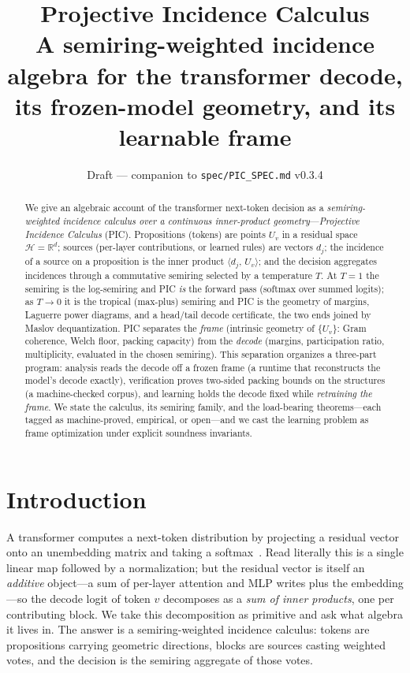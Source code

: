 \documentclass[11pt]{article}
\title{\textbf{Projective Incidence Calculus}\\[0.3em]
\large A semiring-weighted incidence algebra for the transformer decode,\\
its frozen-model geometry, and its learnable frame}
\author{}
\date{Draft --- companion to \texttt{spec/PIC\_SPEC.md} v0.3.4}
\theoremstyle{definition}
\theoremstyle{plain}
\theoremstyle{remark}
\newcommand{\HH}{\mathcal{H}}
\newcommand{\RR}{\mathbb{R}}
\newcommand{\inner}[2]{\langle #1,\, #2\rangle}
\begin{document}
\maketitle

\begin{abstract}
We give an algebraic account of the transformer next-token decision as a \emph{semiring-weighted
incidence calculus over a continuous inner-product geometry}---\emph{Projective Incidence Calculus}
(PIC). Propositions (tokens) are points $U_v$ in a residual space $\HH=\RR^d$; sources (per-layer
contributions, or learned rules) are vectors $d_j$; the incidence of a source on a proposition is the
inner product $\inner{d_j}{U_v}$; and the decision aggregates incidences through a commutative semiring
selected by a temperature $T$. At $T=1$ the semiring is the log-semiring and PIC \emph{is} the forward
pass (softmax over summed logits); as $T\to0$ it is the tropical (max-plus) semiring and PIC is the
geometry of margins, Laguerre power diagrams, and a head/tail decode certificate, the two ends joined
by Maslov dequantization. PIC separates the \emph{frame} (intrinsic geometry of $\{U_v\}$: Gram
coherence, Welch floor, packing capacity) from the \emph{decode} (margins, participation ratio,
multiplicity, evaluated in the chosen semiring). This separation organizes a three-part program:
analysis reads the decode off a frozen frame (a runtime that reconstructs the model's decode exactly),
verification proves two-sided packing bounds on the structures (a machine-checked corpus), and learning
holds the decode fixed while \emph{retraining the frame}. We state the calculus, its semiring family,
and the load-bearing theorems---each tagged as machine-proved, empirical, or open---and we cast the
learning problem as frame optimization under explicit soundness invariants.
\end{abstract}

\section{Introduction}

A transformer computes a next-token distribution by projecting a residual vector onto an unembedding
matrix and taking a softmax~\cite{elhage2021mathematical}. Read literally this is a single linear map followed by a normalization; but
the residual vector is itself an \emph{additive} object---a sum of per-layer attention and MLP writes
plus the embedding---so the decode logit of token $v$ decomposes as a \emph{sum of inner products}, one
per contributing block. We take this decomposition as primitive and ask what algebra it lives in. The
answer is a semiring-weighted incidence calculus: tokens are propositions carrying geometric directions,
blocks are sources casting weighted votes, and the decision is the semiring aggregate of those votes.
\end{document}
